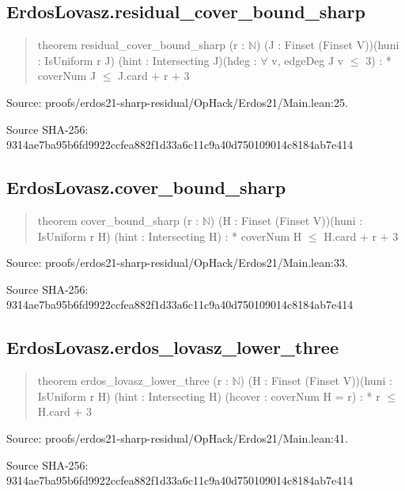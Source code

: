 \documentclass[11pt,a4paper]{article}
\begin{document}
\begin{samepage}
\subsection{ErdosLovasz.residual\_cover\_bound\_sharp}
\begin{quote}\small\ttfamily theorem residual\_cover\_bound\_sharp (r : \ensuremath{\mathbb{N}}) (J : Finset (Finset V))\newline     (huni : IsUniform r J) (hint : Intersecting J)\newline     (hdeg : \ensuremath{\forall} v, edgeDeg J v \ensuremath{\leq} 3) : * coverNum J \ensuremath{\leq} J.card + r + 3\end{quote}
{\small Source: proofs/erdos21-sharp-residual/OpHack/Erdos21/Main.lean:25.\par}

{\small Source SHA-256: 9314ae7ba95b6fd9922ccfea882f1d33a6c11c9a40d750109014c8184ab7e414\par}

\end{samepage}
\begin{samepage}
\subsection{ErdosLovasz.cover\_bound\_sharp}
\begin{quote}\small\ttfamily theorem cover\_bound\_sharp (r : \ensuremath{\mathbb{N}}) (H : Finset (Finset V))\newline     (huni : IsUniform r H) (hint : Intersecting H) : * coverNum H \ensuremath{\leq} H.card + r + 3\end{quote}
{\small Source: proofs/erdos21-sharp-residual/OpHack/Erdos21/Main.lean:33.\par}

{\small Source SHA-256: 9314ae7ba95b6fd9922ccfea882f1d33a6c11c9a40d750109014c8184ab7e414\par}

\end{samepage}
\begin{samepage}
\subsection{ErdosLovasz.erdos\_lovasz\_lower\_three}
\begin{quote}\small\ttfamily theorem erdos\_lovasz\_lower\_three (r : \ensuremath{\mathbb{N}}) (H : Finset (Finset V))\newline     (huni : IsUniform r H) (hint : Intersecting H) (hcover : coverNum H = r) : * r \ensuremath{\leq} H.card + 3\end{quote}
{\small Source: proofs/erdos21-sharp-residual/OpHack/Erdos21/Main.lean:41.\par}

{\small Source SHA-256: 9314ae7ba95b6fd9922ccfea882f1d33a6c11c9a40d750109014c8184ab7e414\par}

\end{samepage}
\end{document}
